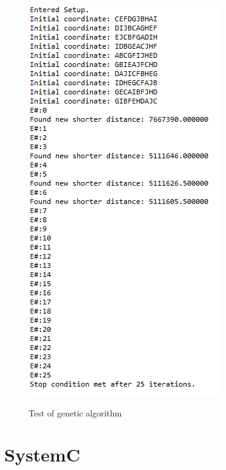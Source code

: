 \begin{figure}[H]
	\centering
	{\includegraphics[width=\textwidth/2]{Images/algo_test_sw.png}}\\[0.5cm]
	\caption{Test of genetic algorithm}
	\label{fig:algo_test_sw}
\end{figure}

\section{SystemC}

